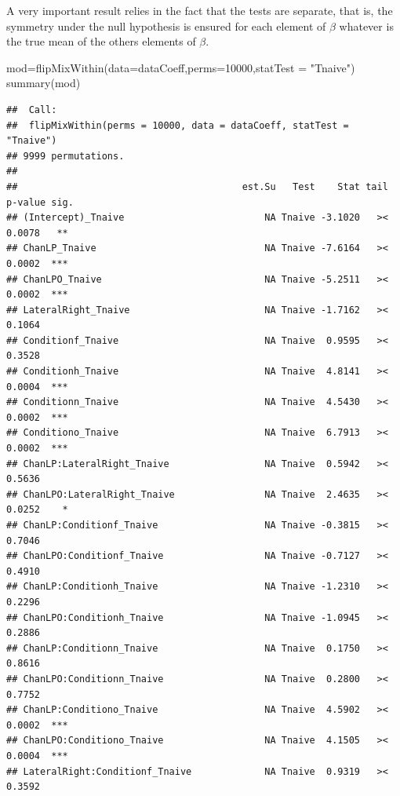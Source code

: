 \documentclass[
]{article}
\newenvironment{Shaded}{\begin{snugshade}}{\end{snugshade}}
\newcommand{\AttributeTok}[1]{\textcolor[rgb]{0.77,0.63,0.00}{#1}}
\newcommand{\DecValTok}[1]{\textcolor[rgb]{0.00,0.00,0.81}{#1}}
\newcommand{\FunctionTok}[1]{\textcolor[rgb]{0.00,0.00,0.00}{#1}}
\newcommand{\NormalTok}[1]{#1}
\newcommand{\OtherTok}[1]{\textcolor[rgb]{0.56,0.35,0.01}{#1}}
\newcommand{\StringTok}[1]{\textcolor[rgb]{0.31,0.60,0.02}{#1}}
\begin{document}
A very important result relies in the fact that the tests are separate,
that is, the symmetry under the null hypothesis is ensured for each
element of \(\beta\) whatever is the true mean of the others elements of
\(\beta\).

\begin{Shaded}
\begin{Highlighting}[]
\NormalTok{mod}\OtherTok{=}\FunctionTok{flipMixWithin}\NormalTok{(}\AttributeTok{data=}\NormalTok{dataCoeff,}\AttributeTok{perms=}\DecValTok{10000}\NormalTok{,}\AttributeTok{statTest =} \StringTok{"Tnaive"}\NormalTok{)}
\FunctionTok{summary}\NormalTok{(mod)}
\end{Highlighting}
\end{Shaded}

\begin{verbatim}
##  Call:
##  flipMixWithin(perms = 10000, data = dataCoeff, statTest = "Tnaive") 
## 9999 permutations.
## 
##                                        est.Su   Test    Stat tail p-value sig.
## (Intercept)_Tnaive                         NA Tnaive -3.1020   ><  0.0078   **
## ChanLP_Tnaive                              NA Tnaive -7.6164   ><  0.0002  ***
## ChanLPO_Tnaive                             NA Tnaive -5.2511   ><  0.0002  ***
## LateralRight_Tnaive                        NA Tnaive -1.7162   ><  0.1064     
## Conditionf_Tnaive                          NA Tnaive  0.9595   ><  0.3528     
## Conditionh_Tnaive                          NA Tnaive  4.8141   ><  0.0004  ***
## Conditionn_Tnaive                          NA Tnaive  4.5430   ><  0.0002  ***
## Conditiono_Tnaive                          NA Tnaive  6.7913   ><  0.0002  ***
## ChanLP:LateralRight_Tnaive                 NA Tnaive  0.5942   ><  0.5636     
## ChanLPO:LateralRight_Tnaive                NA Tnaive  2.4635   ><  0.0252    *
## ChanLP:Conditionf_Tnaive                   NA Tnaive -0.3815   ><  0.7046     
## ChanLPO:Conditionf_Tnaive                  NA Tnaive -0.7127   ><  0.4910     
## ChanLP:Conditionh_Tnaive                   NA Tnaive -1.2310   ><  0.2296     
## ChanLPO:Conditionh_Tnaive                  NA Tnaive -1.0945   ><  0.2886     
## ChanLP:Conditionn_Tnaive                   NA Tnaive  0.1750   ><  0.8616     
## ChanLPO:Conditionn_Tnaive                  NA Tnaive  0.2800   ><  0.7752     
## ChanLP:Conditiono_Tnaive                   NA Tnaive  4.5902   ><  0.0002  ***
## ChanLPO:Conditiono_Tnaive                  NA Tnaive  4.1505   ><  0.0004  ***
## LateralRight:Conditionf_Tnaive             NA Tnaive  0.9319   ><  0.3592     

\end{verbatim}
\end{document}
